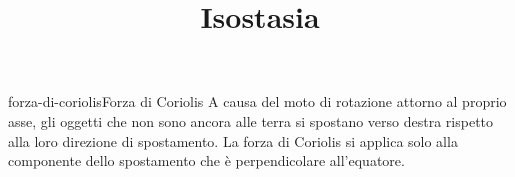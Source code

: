 \documentclass[preview]{standalone}
\begin{document}
\title{Isostasia}
\genpage


\begin{snippetdefinition}{forza-di-coriolis}{Forza di Coriolis}
    A causa del moto di rotazione attorno al proprio asse,
    gli oggetti che non sono ancora alle terra si spostano verso destra rispetto alla loro direzione di spostamento.
    La forza di Coriolis si applica solo alla componente dello spostamento che è perpendicolare all'equatore.
\end{snippetdefinition}

\end{document}
